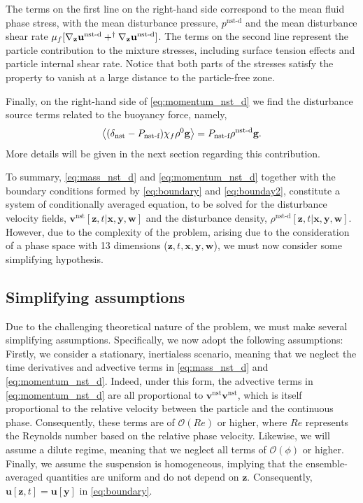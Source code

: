 The terms on the first line on the right-hand side correspond to the mean fluid phase stress, with the mean disturbance pressure, $p^\text{nst-d}$ and the mean disturbance shear rate $\mu_f [{\mathbf{\nabla}_\textbf{z}} \textbf{u}^\text{nst-d}+^\dagger{\mathbf{\nabla}_\textbf{z}} \textbf{u}^\text{nst-d}]$. 
The terms on the second line represent the particle contribution to the mixture stresses, including surface tension effects and particle internal shear rate. 
Notice that both parts of the stresses satisfy the property to vanish at a large distance to the particle-free zone.

Finally, on the right-hand side of \ref{eq:momentum_nst_d} we find the disturbance source terms related to the buoyancy force, namely,
\begin{equation*}
    \left<(\delta_\text{nst} - P_\text{nst-f}) \chi_f \rho^0 \textbf{g}\right>
    = 
    P_\text{nst-f} \rho^\text{nst-d} \textbf{g}. 
\end{equation*}
More details will be given in the next section regarding this contribution. 

To summary, \ref{eq:mass_nst_d} and \ref{eq:momentum_nst_d} together with the boundary conditions formed by \ref{eq:boundary} and \ref{eq:bounday2}, constitute a system of conditionally averaged equation, to be solved for the disturbance velocity fields, $\textbf{v}^\text{nst}[\textbf{z},t|\textbf{x},\textbf{y},\textbf{w}]$ and the disturbance density, $\rho^\text{nst-d}[\textbf{z},t|\textbf{x},\textbf{y},\textbf{w}]$.
However, due to the complexity of the problem, arising due to the consideration of a phase space with  13 dimensions ($\textbf{z},t,\textbf{x},\textbf{y},\textbf{w}$), we must now consider some simplifying hypothesis.

\subsection{Simplifying assumptions}

Due to the challenging theoretical nature of the problem, we must make several simplifying assumptions. Specifically, we now adopt the following assumptions:
Firstly, we consider a stationary, inertialess scenario, meaning that we neglect the time derivatives and advective terms in \ref{eq:mass_nst_d} and \ref{eq:momentum_nst_d}. 
Indeed, under this form, the advective terms in \ref{eq:momentum_nst_d} are all proportional to $\textbf{v}^\text{nst}\textbf{v}^\text{nst}$, which is itself proportional to the relative velocity between the particle and the continuous phase. Consequently, these terms are of $\mathcal{O}(Re)$ or higher, where $Re$ represents the Reynolds number based on the relative phase velocity.
Likewise, we will assume a dilute regime, meaning that we neglect all terms of $\mathcal{O}(\phi)$ or higher. Finally, we assume the suspension is homogeneous, implying that the ensemble-averaged quantities are uniform and do not depend on $\textbf{z}$.
Consequently, $\textbf{u}[\textbf{z},t] = \textbf{u}[\textbf{y}]$ in \ref{eq:boundary}. 


